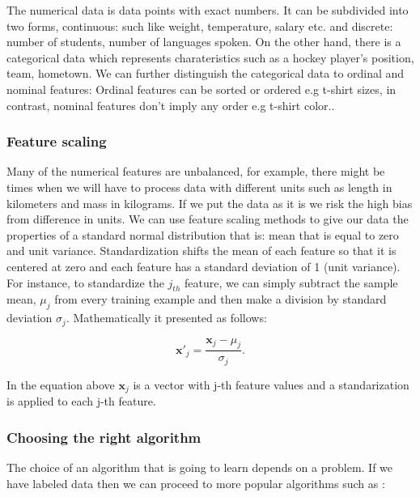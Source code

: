 \documentclass[a4paper,oneside,openright,11pt]{book}
\begin{document}
The numerical data is data points with exact numbers. It can be subdivided into two forms, continuous: such like weight, temperature, salary etc. and discrete: number of students, number of languages spoken. On the other hand, there is a categorical data which represents charateristics such as a hockey player’s position, team, hometown. We can further distinguish the categorical data to ordinal and nominal features: Ordinal features can be sorted or ordered e.g t-shirt sizes, in contrast, nominal features don't imply any order e.g t-shirt color.\cite{raschka}\cite{numericalData}.


\subsubsection{Feature scaling}

Many of the numerical features are unbalanced, for example, there might be times when we will have to process data with different units such as length in kilometers and mass in kilograms. If we put the data as it is we risk the high bias from difference in units. We can use feature scaling methods to give our data the properties of a standard normal distribution that is: mean that is equal to zero and unit variance. Standardization shifts the mean of each feature so that it is centered at zero and each feature has a standard deviation of 1 (unit variance). For instance, to standardize the
$j_{th}$ feature, we can simply subtract the sample mean, $\mu_{j}$ from every training example and then make a division by standard deviation $\sigma_{j}$. Mathematically it presented as follows:


\begin{equation}
    \textbf{x}'_{j} = \frac{\textbf{x}_{j} - \mu_{j}}{\sigma_{j}}.
\end{equation}

In the equation above $\textbf{x}_j$ is a vector with j-th feature values and a standarization is applied to each j-th feature.

\subsubsection{Choosing the right algorithm}

The choice of an algorithm that is going to learn depends on a problem. If we have labeled data then we can proceed to more popular algorithms such as \cite{raschka}:
\end{document}

